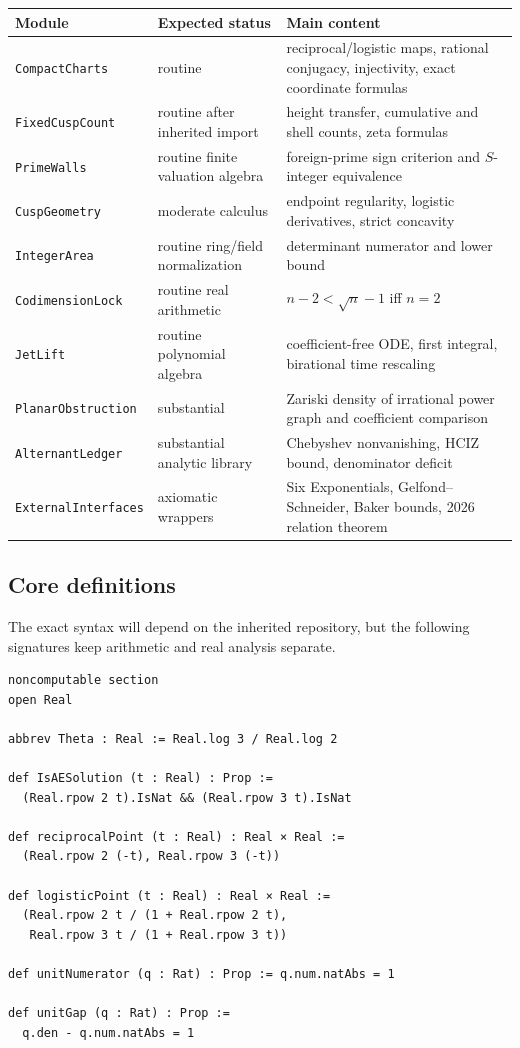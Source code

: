 \documentclass[10pt,oneside]{article}
\theoremstyle{definition}
\theoremstyle{remark}
\begin{document}
\begin{center}
\begin{tabularx}{0.96\textwidth}{p{}p{}X}
\toprule
Module & Expected status & Main content \\
\midrule
\texttt{CompactCharts} & routine & reciprocal/logistic maps, rational conjugacy, injectivity, exact coordinate formulas \\
\texttt{FixedCuspCount} & routine after inherited import & height transfer, cumulative and shell counts, zeta formulas \\
\texttt{PrimeWalls} & routine finite valuation algebra & foreign-prime sign criterion and \(S\)-integer equivalence \\
\texttt{CuspGeometry} & moderate calculus & endpoint regularity, logistic derivatives, strict concavity \\
\texttt{IntegerArea} & routine ring/field normalization & determinant numerator and lower bound \\
\texttt{CodimensionLock} & routine real arithmetic & \(n-2<\sqrt n-1\) iff \(n=2\) \\
\texttt{JetLift} & routine polynomial algebra & coefficient-free ODE, first integral, birational time rescaling \\
\texttt{PlanarObstruction} & substantial & Zariski density of irrational power graph and coefficient comparison \\
\texttt{AlternantLedger} & substantial analytic library & Chebyshev nonvanishing, HCIZ bound, denominator deficit \\
\texttt{ExternalInterfaces} & axiomatic wrappers & Six Exponentials, Gelfond--Schneider, Baker bounds, 2026 relation theorem \\
\bottomrule
\end{tabularx}
\end{center}

\subsection{Core definitions}
The exact syntax will depend on the inherited repository, but the following signatures keep arithmetic and real analysis separate.

\begin{lstlisting}[style=code,language={},caption={Suggested Lean-facing definitions; schematic, not claimed to compile verbatim.}]
noncomputable section
open Real

abbrev Theta : Real := Real.log 3 / Real.log 2

def IsAESolution (t : Real) : Prop :=
  (Real.rpow 2 t).IsNat && (Real.rpow 3 t).IsNat

def reciprocalPoint (t : Real) : Real × Real :=
  (Real.rpow 2 (-t), Real.rpow 3 (-t))

def logisticPoint (t : Real) : Real × Real :=
  (Real.rpow 2 t / (1 + Real.rpow 2 t),
   Real.rpow 3 t / (1 + Real.rpow 3 t))

def unitNumerator (q : Rat) : Prop := q.num.natAbs = 1

def unitGap (q : Rat) : Prop :=
  q.den - q.num.natAbs = 1
\end{lstlisting}
\end{document}
